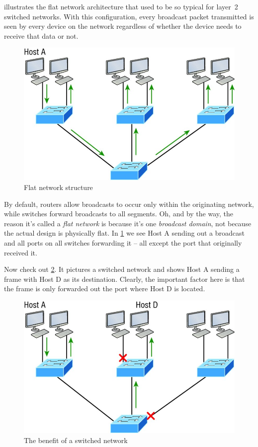  illustrates the flat network architecture that used to be so typical for layer~2 switched networks.
With this configuration, every broadcast packet transmitted is seen by every device on the network regardless of whether the device needs to receive that data or not.


\begin{figure}
   \centering
   \includegraphics{images/c11f001.jpg}
   \caption{Flat network structure}
   \label{fig:flat-network-structure}
\end{figure}


By default, routers allow broadcasts to occur only within the originating network, while switches forward broadcasts to all segments.
Oh, and by the way, the reason it's called a \emph{flat network} is because it's one \emph{broadcast domain}, not because the actual design is physically flat.
In \cref{fig:flat-network-structure} we see Host A sending out a broadcast and all ports on all switches forwarding it -- all except the port that originally received it.

Now check out \cref{fig:benefit-switched-network}.
It pictures a switched network and shows Host A sending a frame with Host D as its destination.
Clearly, the important factor here is that the frame is only forwarded out the port where Host D is located.


\begin{figure}
   \centering
   \includegraphics{images/c11f002.jpg}
   \caption{The benefit of a switched network}
   \label{fig:benefit-switched-network}
\end{figure}


